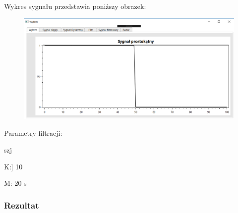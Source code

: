 \documentclass[12pt]{article}
\begin{document}
Wykres sygnału przedstawia poniższy obrazek:
\begin{figure}[h!]
 \centering
 \includegraphics[width=12.3cm]{prost.PNG}
 \vspace{-0.3cm}
 \label{gw}
\end{figure}

Parametry filtracji:

\begin{labeling}{szj}
\item K:] 10
\item [M:] 20 s
\end{labeling}

\subsubsection{Rezultat}
\end{document}
